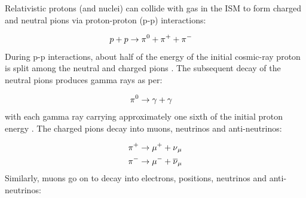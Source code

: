 Relativistic protons (and nuclei) can collide with gas in the ISM to form charged and neutral pions via proton-proton (p-p) interactions:

\begin{equation}
    \begin{aligned}
    p+p&\rightarrow \pionneutral + \pionplus + \pionminus
    \end{aligned}
\end{equation}
\noindent During p-p interactions, about half of the energy of the initial cosmic-ray proton is split among the neutral and charged pions  \citep{2009ARA&A..47..523H}. The subsequent decay of the neutral pions produces gamma rays as per:

\begin{equation}
    \begin{aligned}
    \pionneutral & \rightarrow \gamma +\gamma
    \end{aligned}
\end{equation}
\noindent with each gamma ray carrying approximately one sixth of the initial proton energy \citep{2009ARA&A..47..523H}. The charged pions decay into muons, neutrinos and anti-neutrinos:

\begin{equation}
    \begin{aligned}
    \pionplus &\rightarrow \muonplus + \muonneutrino \\
    \pionminus &\rightarrow \muonminus + \antimuonneutrino
    \end{aligned}
\end{equation}
\noindent Similarly, muons go on to decay into electrons, positions, neutrinos and anti-neutrinos:

